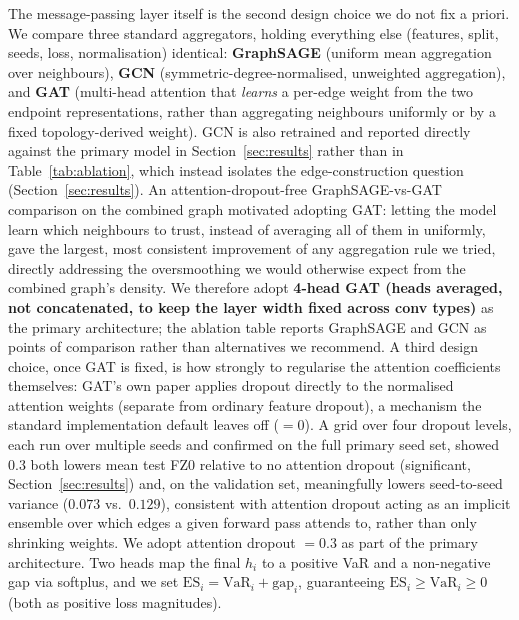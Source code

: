 \documentclass{llncs}
\begin{document}
The message-passing layer itself is the second design choice we do not fix a
priori. We compare three standard aggregators, holding everything else
(features, split, seeds, loss, normalisation) identical: \textbf{GraphSAGE}
\citep{hamilton2017} (uniform mean aggregation over neighbours), \textbf{GCN}
\citep{kipf2017} (symmetric-degree-normalised, unweighted aggregation), and
\textbf{GAT} \citep{velickovic2018} (multi-head attention that \emph{learns} a
per-edge weight from the two endpoint representations, rather than aggregating
neighbours uniformly or by a fixed topology-derived weight). GCN is also
retrained and reported directly against the primary model in
Section~\ref{sec:results} rather than in Table~\ref{tab:ablation}, which
instead isolates the edge-construction question (Section~\ref{sec:results}).
An attention-dropout-free GraphSAGE-vs-GAT comparison on the combined graph
motivated adopting GAT: letting the model learn which neighbours to trust,
instead of averaging all of them in uniformly, gave the largest, most
consistent improvement of any aggregation rule we tried, directly addressing
the oversmoothing we would otherwise expect from the combined graph's density.
We
therefore adopt \textbf{4-head GAT (heads averaged, not concatenated, to keep
the layer width fixed across conv types)} as the primary architecture; the
ablation table reports GraphSAGE and GCN as points of comparison rather than
alternatives we recommend. A third design choice, once GAT is fixed, is how
strongly to regularise the attention coefficients themselves: GAT's own paper
\citep{velickovic2018} applies dropout directly to the normalised attention
weights (separate from ordinary feature dropout), a mechanism the standard
implementation default leaves off ($=0$). A grid over four dropout levels,
each run over multiple seeds and confirmed on the full primary seed set,
showed $0.3$ both lowers mean test FZ0 relative to no attention dropout
(significant, Section~\ref{sec:results}) and, on the validation set,
meaningfully lowers seed-to-seed variance ($0.073$ vs.\ $0.129$), consistent
with attention dropout acting as an implicit ensemble over which edges a given
forward pass attends to, rather than only shrinking weights. We adopt
attention dropout $=0.3$ as part of the primary architecture. Two heads map
the final $h_i$ to a positive VaR
and a non-negative gap via softplus, and we set
$\mathrm{ES}_i = \mathrm{VaR}_i + \mathrm{gap}_i$, guaranteeing
$\mathrm{ES}_i \ge \mathrm{VaR}_i \ge 0$ (both as positive loss magnitudes).
\end{document}

